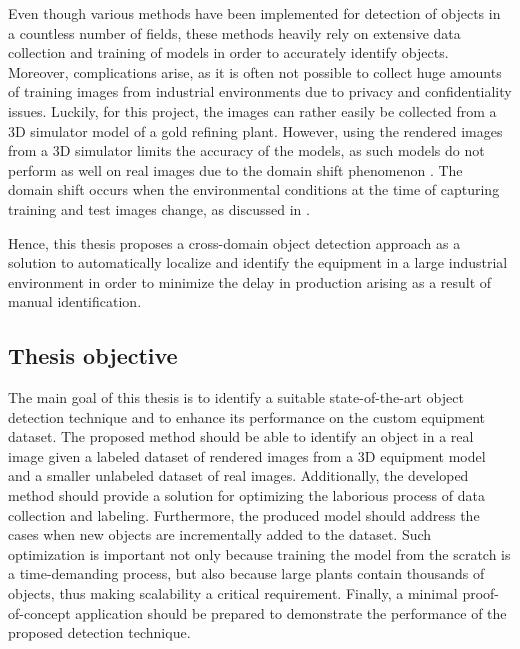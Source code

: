 \documentclass[english, 12pt, a4paper, elec, utf8, a-1b, online]{aaltothesis}
\begin{document}
Even though various methods have been implemented for detection of objects in a countless number of fields\cite{dummy}, these methods heavily rely on extensive data collection and training of models in order to accurately identify objects. Moreover, complications arise, as it is often not possible to collect huge amounts of training images from industrial environments due to privacy and confidentiality issues. Luckily, for this project, the images can rather easily be collected from a 3D simulator model of a gold refining plant. However, using the rendered images from a 3D simulator limits the accuracy of the models, as such models do not perform as well on real images due to the domain shift phenomenon\cite{Ganin2015} . The domain shift occurs when the environmental conditions at the time of capturing training and test images change, as discussed in \cite{Ganin2015}. 

Hence, this thesis proposes a cross-domain object detection approach as a solution to automatically localize and identify the equipment in a large industrial environment in order to minimize the delay in production arising as a result of manual identification. 


\clearpage

\subsection{Thesis objective}
\label{objective} 
The main goal of this thesis is to identify a suitable state-of-the-art object detection technique and to enhance its performance on the custom equipment dataset. The proposed method should be able to identify an object in a real image given a labeled dataset of rendered images from a 3D equipment model and a smaller unlabeled dataset of real images. Additionally, the developed method should provide a solution for optimizing the laborious process of data collection and labeling. Furthermore, the produced model should address the cases when new objects are incrementally added to the dataset.  Such optimization is important not only because training the model from the scratch is a time-demanding process, but also because large plants contain thousands of objects, thus making scalability a critical requirement. Finally, a minimal proof-of-concept application should be prepared to demonstrate the performance of the proposed detection technique.  
\end{document}
